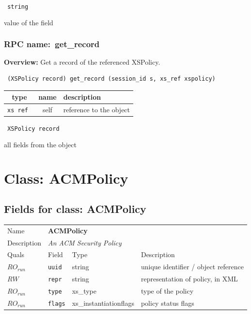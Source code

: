 {\tt
string
}


value of the field
\vspace{0.3cm}
\vspace{0.3cm}
\vspace{0.3cm}
\subsubsection{RPC name:~get\_record}

{\bf Overview:}
Get a record of the referenced XSPolicy.

\begin{verbatim} (XSPolicy record) get_record (session_id s, xs_ref xspolicy)\end{verbatim}




\vspace{0.3cm}
\begin{tabular}{|c|c|p{7cm}|}
 \hline
{\bf type} & {\bf name} & {\bf description} \\ \hline
{\tt xs ref } & self & reference to the object \\ \hline

\end{tabular}

\vspace{0.3cm}

{\tt
XSPolicy record
}


all fields from the object
\vspace{0.3cm}
\vspace{0.3cm}
\vspace{0.3cm}
\newpage
\section{Class: ACMPolicy}
\subsection{Fields for class: ACMPolicy}
\begin{longtable}{|lllp{}|}
\hline
\multicolumn{1}{|l}{Name} & \multicolumn{3}{l|}{\bf ACMPolicy} \\
\multicolumn{1}{|l}{Description} & \multicolumn{3}{l|}{\parbox{11cm}{\em An ACM Security Policy}} \\
\hline
Quals & Field & Type & Description \\
\hline
$\mathit{RO}_\mathit{run}$ &  {\tt uuid} & string & unique identifier / object reference \\
$\mathit{RW}$              &  {\tt repr} & string & representation of policy, in XML \\
$\mathit{RO}_\mathit{run}$ &  {\tt type} & xs\_type & type of the policy \\
$\mathit{RO}_\mathit{run}$ & {\tt flags} & xs\_instantiationflags & policy
status flags \\
\hline
\end{longtable}

